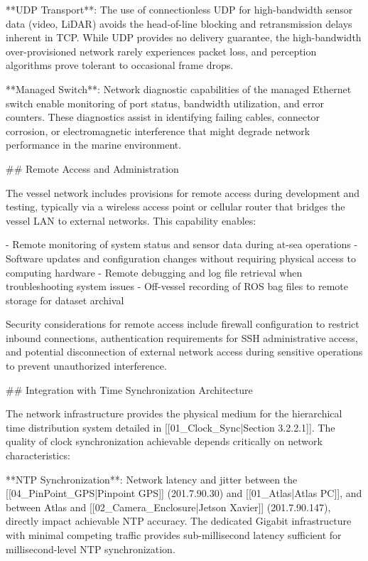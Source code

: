 \documentclass{erauthesis}
\begin{document}
**UDP Transport**: The use of connectionless UDP for high-bandwidth sensor data (video, LiDAR) avoids the head-of-line blocking and retransmission delays inherent in TCP. While UDP provides no delivery guarantee, the high-bandwidth over-provisioned network rarely experiences packet loss, and perception algorithms prove tolerant to occasional frame drops.

**Managed Switch**: Network diagnostic capabilities of the managed Ethernet switch enable monitoring of port status, bandwidth utilization, and error counters. These diagnostics assist in identifying failing cables, connector corrosion, or electromagnetic interference that might degrade network performance in the marine environment.

## Remote Access and Administration

The vessel network includes provisions for remote access during development and testing, typically via a wireless access point or cellular router that bridges the vessel LAN to external networks. This capability enables:

- Remote monitoring of system status and sensor data during at-sea operations
- Software updates and configuration changes without requiring physical access to computing hardware
- Remote debugging and log file retrieval when troubleshooting system issues
- Off-vessel recording of ROS bag files to remote storage for dataset archival

Security considerations for remote access include firewall configuration to restrict inbound connections, authentication requirements for SSH administrative access, and potential disconnection of external network access during sensitive operations to prevent unauthorized interference.

## Integration with Time Synchronization Architecture

The network infrastructure provides the physical medium for the hierarchical time distribution system detailed in [[01_Clock_Sync|Section 3.2.2.1]]. The quality of clock synchronization achievable depends critically on network characteristics:

**NTP Synchronization**: Network latency and jitter between the [[04_PinPoint_GPS|Pinpoint GPS]] (201.7.90.30) and [[01_Atlas|Atlas PC]], and between Atlas and [[02_Camera_Enclosure|Jetson Xavier]] (201.7.90.147), directly impact achievable NTP accuracy. The dedicated Gigabit infrastructure with minimal competing traffic provides sub-millisecond latency sufficient for millisecond-level NTP synchronization.
\end{document}
